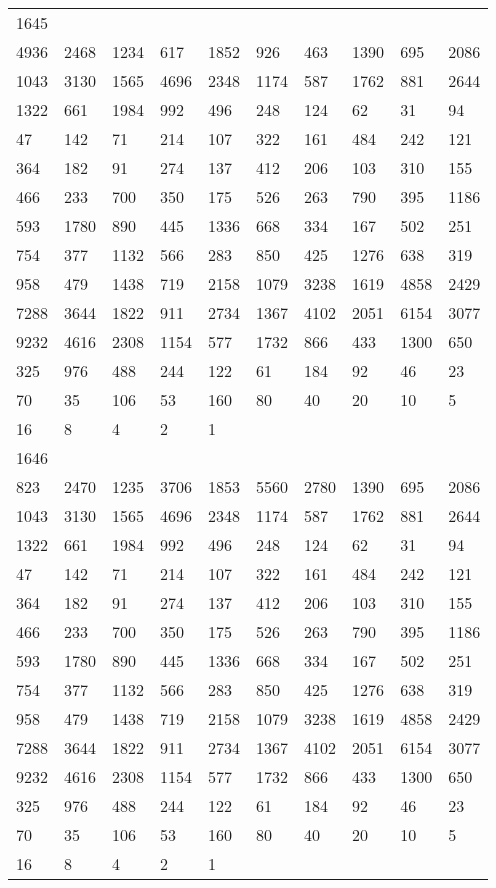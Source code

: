 \begin{longtable}{*{10}{l}}
1645&&&&&&&&&\\
4936& 2468& 1234& 617& 1852& 926& 463& 1390& 695& 2086\\
1043& 3130& 1565& 4696& 2348& 1174& 587& 1762& 881& 2644\\
1322& 661& 1984& 992& 496& 248& 124& 62& 31& 94\\
47& 142& 71& 214& 107& 322& 161& 484& 242& 121\\
364& 182& 91& 274& 137& 412& 206& 103& 310& 155\\
466& 233& 700& 350& 175& 526& 263& 790& 395& 1186\\
593& 1780& 890& 445& 1336& 668& 334& 167& 502& 251\\
754& 377& 1132& 566& 283& 850& 425& 1276& 638& 319\\
958& 479& 1438& 719& 2158& 1079& 3238& 1619& 4858& 2429\\
7288& 3644& 1822& 911& 2734& 1367& 4102& 2051& 6154& 3077\\
9232& 4616& 2308& 1154& 577& 1732& 866& 433& 1300& 650\\
325& 976& 488& 244& 122& 61& 184& 92& 46& 23\\
70& 35& 106& 53& 160& 80& 40& 20& 10& 5\\
16& 8& 4& 2& 1& \\

1646&&&&&&&&&\\
823& 2470& 1235& 3706& 1853& 5560& 2780& 1390& 695& 2086\\
1043& 3130& 1565& 4696& 2348& 1174& 587& 1762& 881& 2644\\
1322& 661& 1984& 992& 496& 248& 124& 62& 31& 94\\
47& 142& 71& 214& 107& 322& 161& 484& 242& 121\\
364& 182& 91& 274& 137& 412& 206& 103& 310& 155\\
466& 233& 700& 350& 175& 526& 263& 790& 395& 1186\\
593& 1780& 890& 445& 1336& 668& 334& 167& 502& 251\\
754& 377& 1132& 566& 283& 850& 425& 1276& 638& 319\\
958& 479& 1438& 719& 2158& 1079& 3238& 1619& 4858& 2429\\
7288& 3644& 1822& 911& 2734& 1367& 4102& 2051& 6154& 3077\\
9232& 4616& 2308& 1154& 577& 1732& 866& 433& 1300& 650\\
325& 976& 488& 244& 122& 61& 184& 92& 46& 23\\
70& 35& 106& 53& 160& 80& 40& 20& 10& 5\\
16& 8& 4& 2& 1& \\


\end{longtable}
